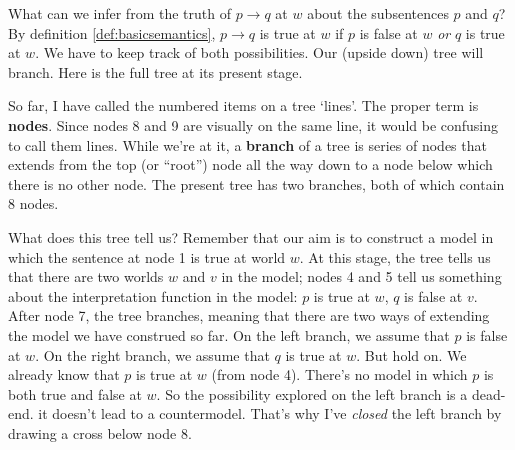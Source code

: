 What can we infer from the truth of $p\to q$ at $w$ about the subsentences $p$
and $q$? By definition \ref{def:basicsemantics}, $p \to q$ is true at $w$ if $p$
is false at $w$ \emph{or} $q$ is true at $w$. We have to keep track of both
possibilities. Our (upside down) tree will branch. Here is the full tree at its
present stage.

\begin{center}
\end{center}

So far, I have called the numbered items on a tree `lines'. The proper term is
\textbf{nodes}. Since nodes 8 and 9 are visually on the same line, it would be
confusing to call them lines. While we're at it, a \textbf{branch} of a tree is
series of nodes that extends from the top (or ``root'') node all the way down to
a node below which there is no other node. The present tree has two branches,
both of which contain 8 nodes.

What does this tree tell us? Remember that our aim is to construct a model in
which the sentence at node 1 is true at world $w$. At this stage, the tree tells
us that there are two worlds $w$ and $v$ in the model; nodes 4 and 5 tell us
something about the interpretation function in the model: $p$ is true at $w$,
$q$ is false at $v$. After node 7, the tree branches, meaning that there are two
ways of extending the model we have construed so far. On the left branch, we
assume that $p$ is false at $w$. On the right branch, we assume that $q$ is true
at $w$. But hold on. We already know that $p$ is true at $w$ (from node 4).
There's no model in which $p$ is both true and false at $w$. So the possibility
explored on the left branch is a dead-end. it doesn't lead to a countermodel.
That's why I've \emph{closed} the left branch by drawing a cross below node 8.

